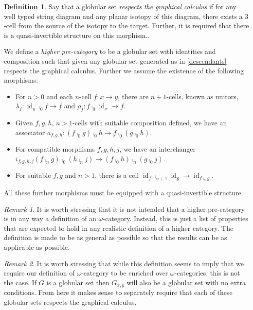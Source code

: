 \documentclass[draft]{article}
\theoremstyle{definition} \newtheorem{definition}{Definition}
\theoremstyle{remark} \newtheorem{remark}{Remark}
\DeclareMathOperator{\id}{id}
\begin{document}
\begin{definition}\label{def:higher-cat}
  Say that a globular set \emph{respects the graphical calculus} if
  for any well typed string diagram and any planar isotopy of this
  diagram, there exists a \(3\)-cell from the source of the isotopy to
  the target. Further, it is required that there is a quasi-invertible
  structure on this morphism..

  We define a \emph{higher pre-category} to be a globular set with
  identities and composition such that given any globular set
  generated as in \cref{descendants} respects the graphical calculus.
  Further we assume the existence of the following morphisms:
  \begin{itemize}
  \item For \(n>0\) and each \(n\)-cell \(f: x \to y\), there are
    \(n+1\)-cells, known as unitors, \(\lambda_f: \id_y \comp_0 f \to
    f\) and \(\rho_f: f \comp_0 \id_x \to f\).
  \item Given \(f,g,h\), \(n>1\)-cells with suitable composition
    defined, we have an associator \(a_{f,g,h} : (f \comp_0 g) \comp_0
    h \to f \comp_0 (g \comp_0 h)\).
  \item For compatible morphisms \(f,g,h,j\), we have an interchanger
    \(i_{f,g,h,j}(f \comp_n g) \comp_0 (h \comp_n j) \to (f \comp_0 h)
    \comp_n (g \comp_0 j)\).
  \item For suitable \(f,g\) and \(n > 1\), there is a cell \(\id_f
    \comp_{n+1} \id_g \to \id_{f \comp_n g}\).
  \end{itemize}
  All these further morphisms must be equipped with a quasi-invertible
  structure.
\end{definition}

\begin{remark}
  It is worth stressing that it is not intended that a higher
  pre-category is in any way a definition of an \(\omega\)-category.
  Instead, this is just a list of properties that are expected to hold
  in any realistic definition of a higher category. The definition is
  made to be as general as possible so that the results can be as
  applicable as possible.
\end{remark}

\begin{remark}
  It is worth stressing that while this definition seems to imply that
  we require our definition of \(\omega\)-category to be enriched over
  \(\omega\)-categories, this is not the case. If \(G\) is a globular
  set then \(G_{x,y}\) will also be a globular set with no extra
  conditions. From here it makes sense to separately require that each
  of these globular sets respects the graphical calculus.
\end{remark}
\end{document}
